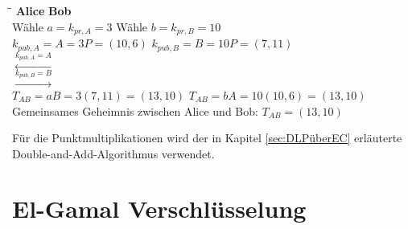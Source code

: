 \begin{tabbing}
\qquad \qquad \qquad \qquad \qquad \qquad \qquad \qquad \= \qquad \qquad \qquad \= \qquad \qquad \qquad \qquad \qquad \qquad \qquad \qquad \kill
\textbf{Alice} \> \> \textbf{Bob}\\
Wähle $a=k_{pr,A} = 3$ \> \> Wähle $b=k_{pr,B} = 10$\\
$k_{pub,A} = A = 3P = (10,6)$ \> \> $k_{pub,B} = B = 10P = (7,11)$\\
\> $\xleftarrow{k_{pub,A} = A}$ \> \\
\> $\xrightarrow{k_{pub,B} = B}$ \> \\
$T_{AB} = aB = 3(7,11) = (13,10)$ \> \> $T_{AB} = bA = 10(10,6) = (13,10)$\\
Gemeinsames Geheimnis zwischen Alice und Bob: $T_{AB} = (13,10)$\\
\end{tabbing}
Für die Punktmultiplikationen wird der in Kapitel \ref{sec:DLPüberEC} erläuterte Double-and-Add-Algorithmus verwendet.



\section{El-Gamal Verschlüsselung}